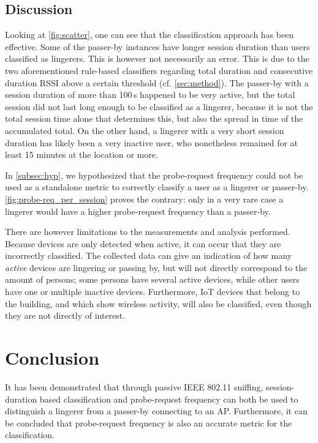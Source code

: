 \documentclass[twocolumn]{article}
\begin{document}
\subsection{Discussion}
\label{sec:class:discussion}

Looking at \autoref{fig:scatter}, one can see that the classification approach has been effective. Some of the passer-by instances have longer session duration than users classified as lingerers. This is however not necessarily an error. This is due to the two aforementioned rule-based classifiers regarding total duration and consecutive duration RSSI above a certain threshold (cf. \autoref{sec:method}). The passer-by with a session duration of more than 100\,s happened to be very active, but the total session did not last long enough to be classified as a lingerer, because it is not the total session time alone that determines this, but also the spread in time of the accumulated total. On the other hand, a lingerer with a very short session duration has likely been a very inactive user, who nonetheless remained for at least 15 minutes at the location or more.

In \autoref{subsec:hyp}, we hypothesized that the probe-request frequency could not be used as a standalone metric to correctly classify a user as a lingerer or passer-by. \autoref{fig:probe-req_per_session} proves the contrary: only in a very rare case a lingerer would have a higher probe-request frequency than a passer-by.

There are however limitations to the measurements and analysis performed. Because devices are only detected when active, it can occur that they are incorrectly classified. The collected data can give an indication of how many \emph{active} devices are lingering or passing by, but will not directly correspond to the amount of persons; some persons have several active devices, while other users have one or multiple inactive devices. Furthermore, IoT devices that belong to the building, and which show wireless activity, will also be classified, even though they are not directly of interest.

\section{Conclusion}
It has been demonstrated that through passive IEEE 802.11 sniffing, session-duration based classification and probe-request frequency can both be used to distinguish a lingerer from a passer-by connecting to an AP. Furthermore, it can be concluded that probe-request frequency is also an accurate metric for the classification.
\end{document}
